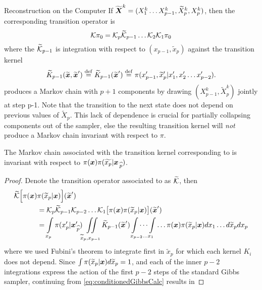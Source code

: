 \begin{chapter}{Reconstruction on the Computer}
If $\widetilde{\mbox{\boldmath$X$}}^k = (X_1^k\dots X_{p-1}^k,\widetilde X_{p}^k,X_p^k)$, then the corresponding transition operator is
\begin{equation}
  \mathcal K\pi_0 = \mathcal K_p \widetilde {\mathcal K}_{p-1}\dots \mathcal K_2 \mathcal K_1 \pi_0
\end{equation}
where the $\widetilde{\mathcal K}_{p-1}$ is integration with respect to $(x_{p-1},\tilde x_p)$ against the transition kernel
\begin{equation}
  \widetilde K_{p-1}(\widetilde{\mbox{\boldmath$x$}},\widetilde{\mbox{\boldmath$x$}}') \stackrel{\rm def}{=} \widetilde K_{p-1}(\widetilde{\mbox{\boldmath$x$}}') \stackrel{\rm def}{=} \pi(x_{p-1}',\widetilde x_p'|x_1',x_2'\dots x_{p-2}').
\end{equation}
 produces a Markov chain with $p+1$ components by drawing $(X_{p-1}^k,\tilde X_p^k)$ jointly at step p-1. 
Note that the transition to the next state does not depend on previous values of $\tilde X_p$.
This lack of dependence is crucial for partially collapsing components out of the sampler, else the resulting transition kernel will \emph{not} produce a Markov chain invariant with respect to $\pi$.
\begin{prop}\label{thm:conditionedGibbsStationary}
  The Markov chain associated with the transition kernel corresponding to  is invariant with respect to $\pi(\mbox{\boldmath$x$})\pi(\widetilde{x_p}|\mbox{\boldmath$x$}_{\,\widehat{p}})$.
\end{prop}
\begin{proof}
  Denote the transition operator associated to  as $\widetilde {\mathcal K}$, then
  \begin{align}
    \widetilde{\mathcal K}\Big[ \pi(\mbox{\boldmath$x$})&\pi(\widetilde x_p|\mbox{\boldmath$x$})\Big](\widetilde{\mbox{\boldmath$x$}}') \nonumber \\ 
    &= \mathcal K_p \widetilde{\mathcal K}_{p-1} \mathcal K_{p-2}\dots\mathcal K_{1} \big[\pi(\mbox{\boldmath$x$})\pi(\widetilde x_p|\mbox{\boldmath$x$})\big](\widetilde{\mbox{\boldmath$x$}}') \nonumber\\
    &= \int\limits_{x_p} \pi(x_p'|\mbox{\boldmath$x$}_{\,\widehat{p}}')\iint\limits_{\widetilde x_p,x_{p-1}}\widetilde K_{p-1}(\widetilde{\mbox{\boldmath$x$}}')\idotsint\limits_{x_{p-2}\dots x_1}\dots \pi(\mbox{\boldmath$x$})\pi(\widetilde x_p|\mbox{\boldmath$x$})dx_1\dots d\widetilde x_p dx_p \nonumber\\
  \end{align}
  where we used Fubini's theorem to integrate first in $\tilde x_p$ for which each kernel $K_i$ does not depend. 
  Since  $\int\pi(\widetilde x_p|\mbox{\boldmath$x$})d\widetilde x_p = 1$, and each of the inner $p-2$ integrations express the action of the first $p-2$ steps of the standard Gibbs sampler, continuing from \eqref{eq:conditionedGibbsCalc} results in 

\end{proof}
\end{chapter}
